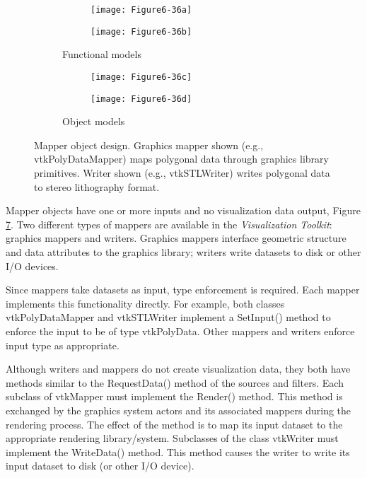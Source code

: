 \begin{description}[leftmargin=0cm,labelindent=0cm]
\begin{figure}[htb]
	\begin{subfigure}[h]{0.48\linewidth}
		\begin{subfigure}[h]{0.48\linewidth}
			\texttt{[image: Figure6-36a]}
			\label{fig:Figure6-36a}
		\end{subfigure}
		\hfill
		\begin{subfigure}[h]{0.48\linewidth}
			\texttt{[image: Figure6-36b]}
			\label{fig:Figure6-36b}
		\end{subfigure}
		\caption{Functional models}
	\end{subfigure}
	\hfill
	\begin{subfigure}[h]{0.48\linewidth}
		\begin{subfigure}[h]{0.48\linewidth}
			\texttt{[image: Figure6-36c]}
			\label{fig:Figure6-36c}
		\end{subfigure}
		\begin{subfigure}[h]{0.48\linewidth}
			\texttt{[image: Figure6-36d]}
			\label{fig:Figure6-36d}
		\end{subfigure}
		\caption{Object models}
	\end{subfigure}
	\caption{Mapper object design. Graphics mapper shown (e.g., vtkPolyDataMapper) maps polygonal data through graphics library primitives. Writer shown (e.g., vtkSTLWriter) writes polygonal data to stereo lithography format.}\label{fig:Figure6-36}
\end{figure}

\item[Mapper Design.]
\label{subsubsec:mapper_design}

Mapper objects have one or more inputs and no visualization data output, Figure \ref{fig:Figure6-36}. Two different types of mappers are available in the \emph{Visualization Toolkit}: graphics mappers and writers. Graphics mappers interface geometric structure and data attributes to the graphics library; writers write datasets to disk or other I/O devices.

Since mappers take datasets as input, type enforcement is required. Each mapper implements this functionality directly. For example, both classes vtkPolyDataMapper and vtkSTLWriter implement a SetInput() method to enforce the input to be of type vtkPolyData. Other mappers and writers enforce input type as appropriate.

Although writers and mappers do not create visualization data, they both have methods similar to the RequestData() method of the sources and filters. Each subclass of vtkMapper must implement the Render() method. This method is exchanged by the graphics system actors and its associated mappers during the rendering process. The effect of the method is to map its input dataset to the appropriate rendering library/system. Subclasses of the class vtkWriter must implement the WriteData() method. This method causes the writer to write its input dataset to disk (or other I/O device).


\end{description}
